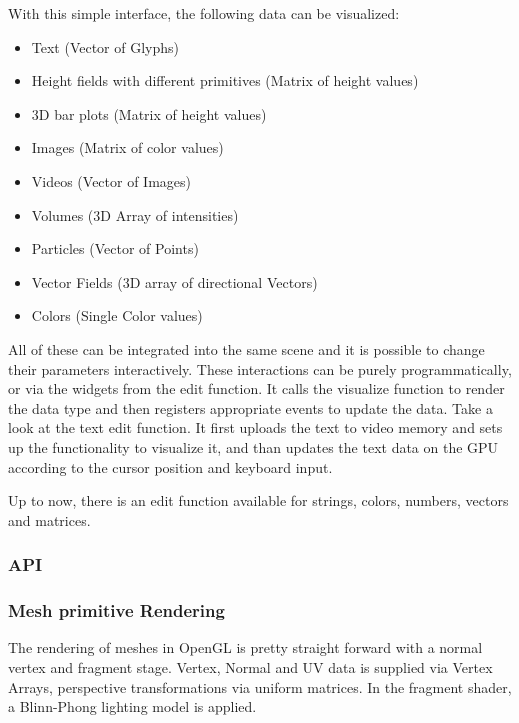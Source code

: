 With this simple interface, the following data can be visualized:

\begin{itemize}
	\item Text (Vector of Glyphs)
	\item Height fields with different primitives (Matrix of height values)
	\item 3D bar plots (Matrix of height values)
	\item Images (Matrix of color values)
	\item Videos (Vector of Images)
	\item Volumes (3D Array of intensities)
	\item Particles (Vector of Points)
	\item Vector Fields (3D array of directional Vectors)
    \item Colors (Single Color values)
\end{itemize}

All of these can be integrated into the same scene and it is possible to change their parameters interactively.
These interactions can be purely programmatically, or via the widgets from the edit function.
It calls the visualize function to render the data type and then registers appropriate events to update the data.
Take a look at the text edit function.
It first uploads the text to video memory and sets up the functionality to visualize it, and than updates the text data on the GPU according to the cursor position and keyboard input.

Up to now, there is an edit function available for strings, colors, numbers, vectors and matrices.



\subsubsection{API}


\subsubsection{Mesh primitive Rendering}
The rendering of meshes in OpenGL is pretty straight forward with a normal vertex and fragment stage.
Vertex, Normal and UV data is supplied via Vertex Arrays, perspective transformations via uniform matrices.
In the fragment shader, a Blinn-Phong lighting model is applied.

